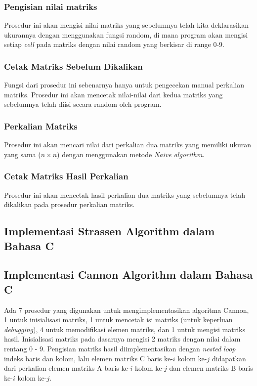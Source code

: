 \documentclass[conference]{IEEEtran}
\begin{document}
\subsubsection{Pengisian nilai matriks}
Prosedur ini akan mengisi nilai matriks yang sebelumnya telah kita deklarasikan ukurannya dengan menggunakan fungsi random, 
di mana program akan mengisi setiap \textit{cell} pada matriks dengan nilai random yang berkisar di range 0-9.
\subsubsection{Cetak Matriks Sebelum Dikalikan}
Fungsi dari prosedur ini sebenarnya hanya untuk pengecekan manual perkalian matriks. 
Prosedur ini akan mencetak nilai-nilai dari kedua matriks yang sebelumnya telah diisi secara random oleh program.
\subsubsection{Perkalian Matriks}
Prosedur ini akan mencari nilai dari perkalian dua matriks yang memiliki ukuran yang sama ($n\times n$) dengan menggunakan metode \textit{Naive algorithm}.
\subsubsection{Cetak Matriks Hasil Perkalian}
Prosedur ini akan mencetak hasil perkalian dua matriks yang sebelumnya telah dikalikan pada prosedur perkalian matriks.

\subsection{Implementasi Strassen Algorithm dalam Bahasa C}

\subsection{Implementasi Cannon Algorithm dalam Bahasa C}
Ada 7 prosedur yang digunakan untuk mengimplementasikan algoritma Cannon, 1 untuk inisialisasi matriks, 1 untuk mencetak isi matriks (untuk keperluan \textit{debugging}), 
4 untuk memodifikasi elemen matriks, dan 1 untuk mengisi matriks hasil.
Inisialisasi matriks pada dasarnya mengisi 2 matriks dengan nilai dalam rentang 0 - 9.
Pengisian matriks hasil diimplementasikan dengan \textit{nested loop} indeks baris dan kolom, 
lalu elemen matriks C baris ke-$i$ kolom ke-$j$ didapatkan dari perkalian elemen matriks A baris ke-$i$ kolom ke-$j$ dan elemen matriks B baris ke-$i$ kolom ke-$j$.
\end{document}

